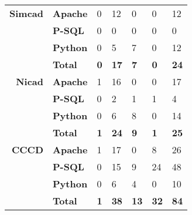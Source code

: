 \documentclass[smallextended]{svjour3}       %
\begin{document}
\begin{table}[thb!]
\begin{center}
\begin{tabular}{r||l|l|l|l|l|l}
 \hline \hline
\bfseries Simcad & \bfseries Apache & 0 & 12 & 0 & 0 & 12 \\ \cline{2-7}
& \bfseries P-SQL & 0 & 0 & 0 & 0 & 0 \\ \cline{2-7}
& \bfseries Python& 0 & 5 & 7 & 0 & 12 \\ \cline{2-7}
& \bfseries Total & \bfseries 0  & \bfseries 17   & \bfseries 7  & \bfseries 0  &  \bfseries  24 \\ \cline{2-7}
 \hline \hline
 \bfseries Nicad & \bfseries Apache & 1 & 16 & 0 & 0 & 17 \\ \cline{2-7}
& \bfseries P-SQL & 0 & 2 & 1 & 1 & 4 \\ \cline{2-7}
& \bfseries Python& 0 & 6 & 8 & 0 & 14 \\ \cline{2-7}
& \bfseries Total & \bfseries 1  & \bfseries 24   & \bfseries 9  & \bfseries 1  &  \bfseries  25 \\ \cline{2-7}
 \hline \hline
\bfseries CCCD & \bfseries Apache & 1 & 17 & 0 & 8 & 26 \\ \cline{2-7}
& \bfseries P-SQL & 0 & 15 & 9 & 24 & 48 \\ \cline{2-7}
& \bfseries Python& 0 & 6 & 4 & 0 & 10 \\ \cline{2-7}
& \bfseries Total & \bfseries 1  & \bfseries 38   & \bfseries 13  & \bfseries 32  &  \bfseries 84 \\ \cline{2-7}
 \hline %


\end{tabular}
\end{center}
\end{table}
\end{document}
